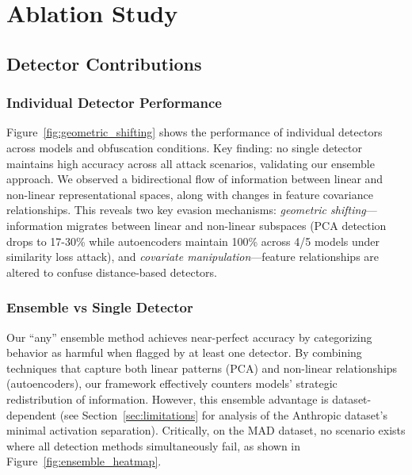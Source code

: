 


\section{Ablation Study} \label{sec:ablation}

\subsection{Detector Contributions} \label{sec:detector_contributions}

\subsubsection{Individual Detector Performance}

Figure~\ref{fig:geometric_shifting} shows the performance of individual detectors across models and obfuscation conditions. Key finding: no single detector maintains high accuracy across all attack scenarios, validating our ensemble approach.
We observed a bidirectional flow of information between linear and non-linear representational spaces, along with changes in feature covariance relationships. This reveals two key evasion mechanisms: \textit{geometric shifting}---information migrates between linear and non-linear subspaces (PCA detection drops to 17-30\% while autoencoders maintain 100\% across 4/5 models under similarity loss attack), and \textit{covariate manipulation}---feature relationships are altered to confuse distance-based detectors.

\subsubsection{Ensemble vs Single Detector}

Our ``any'' ensemble method achieves near-perfect accuracy by categorizing behavior as harmful when flagged by at least one detector. By combining techniques that capture both linear patterns (PCA) and non-linear relationships (autoencoders), our framework effectively counters models' strategic redistribution of information. However, this ensemble advantage is dataset-dependent (see Section~\ref{sec:limitations} for analysis of the Anthropic dataset's minimal activation separation).
Critically, on the MAD dataset, no scenario exists where all detection methods simultaneously fail, as shown in Figure~\ref{fig:ensemble_heatmap}.

